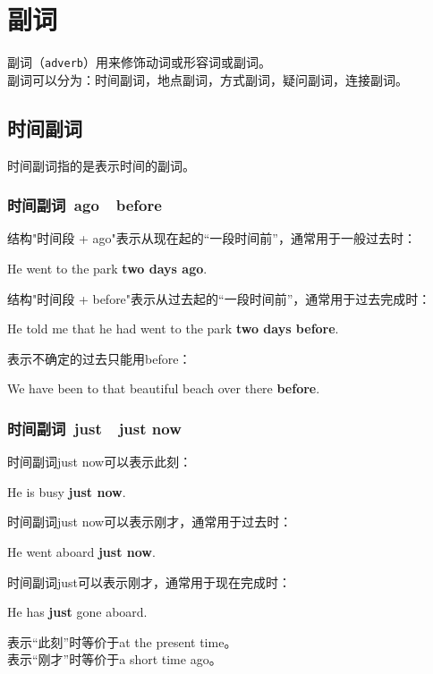 \documentclass[UTF8]{ctexart}
\newcommand{\littf}[1]{{\hspace{3pt}\ttfamily #1}}
\begin{document}
\newpage

\section{副词}
    副词（\texttt{adverb}）用来修饰动词或形容词或副词。\\[3mm]
    副词可以分为：时间副词，地点副词，方式副词，疑问副词，连接副词。

\subsection{时间副词}
    时间副词指的是表示时间的副词。

\subsubsection{时间副词~\littf{ago}~~\littf{before}}
    结构\littf{"\hspace{0pt}时间段 + ago"}表示从现在起的“一段时间前”，通常用于一般过去时：
    \begin{center}
        \large\ttfamily
        He went to the park \textbf{two days ago}.\\[6mm]
    \end{center}
    结构\littf{"\hspace{0pt}时间段 + before"}表示从过去起的“一段时间前”，通常用于过去完成时：
    \begin{center}
        \large\ttfamily
        He told me that he had went to the park \textbf{two days before}.\\[6mm]
    \end{center}
    表示不确定的过去只能用\littf{before}：
    \begin{center}
        \large\ttfamily
        We have been to that beautiful beach over there \textbf{before}.
    \end{center}\vspace{5pt}

\subsubsection{时间副词~\littf{just}~~\littf{just now}}
    时间副词\littf{just now}可以表示此刻：
    \begin{center}
        \large\ttfamily
        He is busy \textbf{just now}.\\[6mm]
    \end{center}
    时间副词\littf{just now}可以表示刚才，通常用于过去时：
    \begin{center}
        \large\ttfamily
        He went aboard \textbf{just now}.\\[6mm]
    \end{center}
    时间副词\littf{just}可以表示刚才，通常用于现在完成时：
    \begin{center}
        \large\ttfamily
        He has \textbf{just} gone aboard.\\[6mm]
    \end{center}
    表示“此刻”时等价于\littf{at the present time}。\\[3mm]
    表示“刚才”时等价于\littf{a short time ago}。
\end{document}
